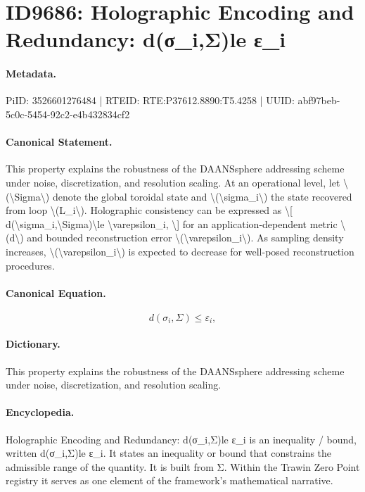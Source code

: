 \section*{ID9686: Holographic Encoding and Redundancy: d(σ\_i,Σ)le ε\_i}
\paragraph{Metadata.}
PiID: 3526601276484 | RTEID: RTE:P37612.8890:T5.4258 | UUID: abf97beb-5c0c-5454-92c2-e4b432834cf2

\paragraph{Canonical Statement.}
This property explains the robustness of the DAANSsphere addressing scheme under noise, discretization, and resolution scaling. At an operational level, let \textbackslash{}(\textbackslash{}Sigma\textbackslash{}) denote the global toroidal state and \textbackslash{}(\textbackslash{}sigma\_i\textbackslash{}) the state recovered from loop \textbackslash{}(L\_i\textbackslash{}). Holographic consistency can be expressed as \textbackslash{}[ d(\textbackslash{}sigma\_i,\textbackslash{}Sigma)\textbackslash{}le \textbackslash{}varepsilon\_i, \textbackslash{}] for an application-dependent metric \textbackslash{}(d\textbackslash{}) and bounded reconstruction error \textbackslash{}(\textbackslash{}varepsilon\_i\textbackslash{}). As sampling density increases, \textbackslash{}(\textbackslash{}varepsilon\_i\textbackslash{}) is expected to decrease for well-posed reconstruction procedures.

\paragraph{Canonical Equation.}
\[
d(\sigma_i,\Sigma)\le \varepsilon_i,
\]

\paragraph{Dictionary.}
This property explains the robustness of the DAANSsphere addressing scheme under noise, discretization, and resolution scaling.

\paragraph{Encyclopedia.}
Holographic Encoding and Redundancy: d(σ\_i,Σ)le ε\_i is an inequality / bound, written d(σ\_i,Σ)le ε\_i. It states an inequality or bound that constrains the admissible range of the quantity. It is built from Σ. Within the Trawin Zero Point registry it serves as one element of the framework's mathematical narrative.
